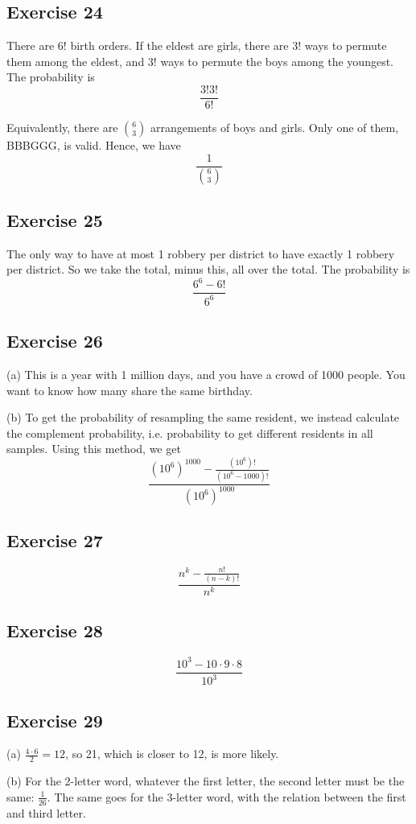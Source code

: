 \documentclass{book}
\begin{document}
\subsection*{Exercise 24}
There are $6!$ birth orders. If the eldest are girls, there are $3!$ ways to permute them among the eldest, and $3!$ ways to permute the boys among the youngest. The probability is
$$\frac{3! 3!}{6!}$$

Equivalently, there are $\binom{6}{3}$ arrangements of boys and girls. Only one of them, BBBGGG, is valid. Hence, we have
$$\frac{1}{\binom{6}{3}}$$

\subsection*{Exercise 25}
The only way to have at most 1 robbery per district to have exactly 1 robbery per district. So we take the total, minus this, all over the total. The probability is
$$\frac{6^6 - 6!}{6^6}$$

\subsection*{Exercise 26}
(a) This is a year with 1 million days, and you have a crowd of 1000 people. You want to know how many share the same birthday.

(b) To get the probability of resampling the same resident, we instead calculate the complement probability, i.e. probability to get different residents in all samples. Using this method, we get
$$\frac{(10^6)^{1000} - \frac{(10^6)!}{(10^6 - 1000)!}}{(10^6)^{1000}}$$

\subsection*{Exercise 27}
$$\frac{n^k - \frac{n!}{(n - k)!}}{n^k}$$

\subsection*{Exercise 28}
$$\frac{10^3 - 10 \cdot 9 \cdot 8}{10^3}$$

\subsection*{Exercise 29}
(a) $\frac{4 \cdot 6}{2} = 12$, so 21, which is closer to 12, is more likely.

\noindent
(b) For the 2-letter word, whatever the first letter, the second letter must be the same: $\frac{1}{26}$. The same goes for the 3-letter word, with the relation between the first and third letter.
\end{document}
